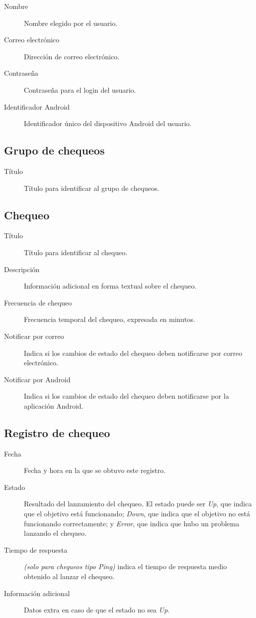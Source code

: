 \begin{description}
\item[Nombre] Nombre elegido por el usuario.
\item[Correo electrónico] Dirección de correo electrónico.
\item[Contraseña] Contraseña para el login del usuario.
\item[Identificador Android] Identificador único del dispositivo Android del usuario.
\end{description}

\subsection{Grupo de chequeos}

\begin{description}
\item[Título] Título para identificar al grupo de chequeos.
\end{description}

\subsection{Chequeo}

\begin{description}
\item[Título] Título para identificar al chequeo.
\item[Descripción] Información adicional en forma textual sobre el chequeo.
\item[Frecuencia de chequeo] Frecuencia temporal del chequeo, expresada en minutos.
\item[Notificar por correo] Indica si los cambios de estado del chequeo deben notificarse por correo electrónico.
\item[Notificar por Android] Indica si los cambios de estado del chequeo deben notificarse por la aplicación Android.
\end{description}

\subsection{Registro de chequeo}

\begin{description}
\item[Fecha] Fecha y hora en la que se obtuvo este registro.
\item[Estado] Resultado del lanzamiento del chequeo. El estado puede ser
  \textit{Up}, que indica que el objetivo está funcionando; \textit{Down}, que
  indica que el objetivo no está funcionando correctamente; y \textit{Error},
  que indica que hubo un problema lanzando el chequeo.
\item[Tiempo de respuesta] \textit{(solo para chequeos tipo Ping)} indica el
  tiempo de respuesta medio obtenido al lanzar el chequeo.
\item[Información adicional] Datos extra en caso de que el estado no sea \textit{Up}.
\end{description}

